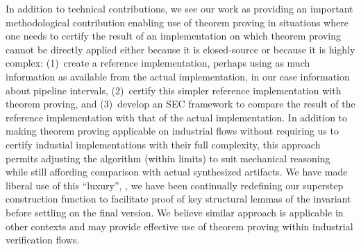 \begin{comment}
ACL2 is also used a lot in hardware 
verification~\cite{Russinoff,car2,car,Hardin,ray-abstracting,ray-connecting,ray-certification}. 
Our project is however somewhat different from the
traditional applications of theorem provers. 
First, since an over-arching goal is to exploit automatic
decision procedures, we use theorem proving primarily to
complement automated tools. Second, we eschew theorem
proving on inherently complex or low-level implementations.
Third, interactive theorem proving is acceptable for
one-time use, in certification of a transformation, 
but not as part of a methodology that
requires ongoing use in certification of each design. The
constraints are imposed by the the environment in which we
envision our framework being deployed: it may not be
possible to have a dedicated team of experts doing theorem
proving as full-time jobs. Finally, the loop pipelining transformation
we verify are proprietary to the synthesis tools. Therefore, our approach is
targeting verification of transformations
which are closed-source (and exceedingly complex), thus
making traditional program verification techniques unusable.
Our approach shows a novel way in which theorem
proving can be applied even under those constraints, in
concert with automated SEC.
\end{comment}

In addition to technical contributions, we see our work as
providing an important methodological contribution enabling
use of theorem proving in situations where one needs to
certify the result of an implementation on which theorem
proving cannot be directly applied either because it is
closed-source or because it is highly complex: (1)~create a
reference implementation, perhaps using as much information
as available from the actual implementation, in our case
information about pipeline intervals, (2)~certify this
simpler reference implementation with theorem proving, and
(3)~develop an SEC framework to compare the result of the
reference implementation with that of the actual
implementation.  In addition to making theorem proving
applicable on industrial flows without requiring us to
certify industial implementations with their full
complexity, this approach permits adjusting the algorithm
(within limits) to suit mechanical reasoning while still
affording comparison with actual synthesized artifacts.  We
have made liberal use of this ``luxury'', \eg, we have
been continually redefining our superstep construction function
to facilitate proof of key structural lemmas of the
invariant before settling on the final version.  We believe similar approach is applicable in
other contexts and may provide effective use of theorem
proving within industrial verification flows.
